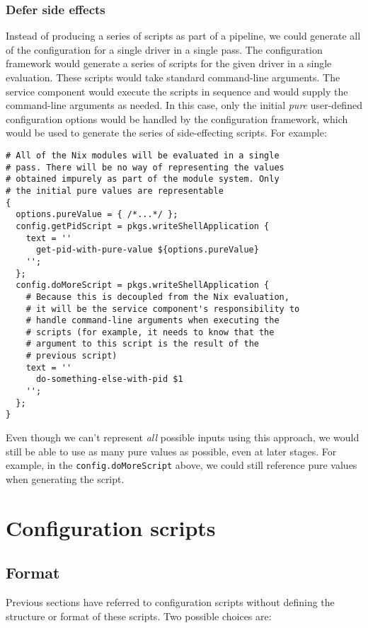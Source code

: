 \documentclass[11pt]{article}
\begin{document}
\subsubsection*{Defer side effects}
\label{sec:orgfd4fa41}
Instead of producing a series of scripts as part of a pipeline, we could generate all of the configuration for a single driver in a single pass. The configuration framework would generate a series of scripts for the given driver in a single evaluation. These scripts would take standard command-line arguments. The service component would execute the scripts in sequence and would supply the command-line arguments as needed. In this case, only the initial \emph{pure} user-defined configuration options would be handled by the configuration framework, which would be used to generate the series of side-effecting scripts. For example:
\lstset{language=nix,label= ,caption= ,captionpos=b,numbers=none}
\begin{lstlisting}
# All of the Nix modules will be evaluated in a single
# pass. There will be no way of representing the values
# obtained impurely as part of the module system. Only
# the initial pure values are representable
{
  options.pureValue = { /*...*/ };
  config.getPidScript = pkgs.writeShellApplication {
    text = ''
      get-pid-with-pure-value ${options.pureValue}
    '';
  };
  config.doMoreScript = pkgs.writeShellApplication {
    # Because this is decoupled from the Nix evaluation,
    # it will be the service component's responsibility to
    # handle command-line arguments when executing the
    # scripts (for example, it needs to know that the
    # argument to this script is the result of the
    # previous script)
    text = ''
      do-something-else-with-pid $1
    '';
  };
}
\end{lstlisting}
Even though we can't represent \emph{all} possible inputs using this approach, we would still be able to use as many pure values as possible, even at later stages. For example, in the \texttt{config.doMoreScript} above, we could still reference pure values when generating the script.
\section*{Configuration scripts}
\label{sec:org4aa7ff8}
\subsection*{Format}
\label{sec:org03ceece}
Previous sections have referred to configuration scripts without defining the structure or format of these scripts. Two possible choices are:
\end{document}
